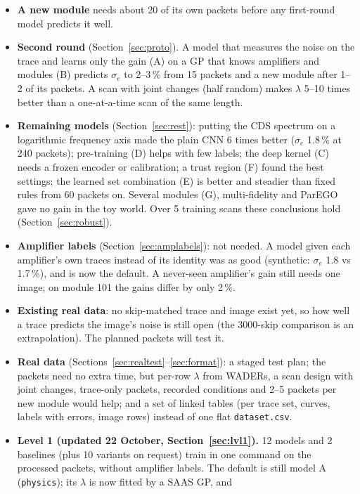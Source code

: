 \documentclass[10pt]{article}
\newcommand{\code}[1]{\texttt{#1}}
\begin{document}
\begin{basic}
\begin{itemize}
  traces it is 3.6\,\%.
\item \textbf{A new module} needs about 20 of its own packets before any first-round model predicts it well.
\item \textbf{Second round} (Section~\ref{sec:proto}). A model that measures the noise on the trace and learns only the gain (A) on a GP
  that knows amplifiers and modules (B) predicts $\sigma_e$ to 2--3\,\% from 15 packets and a new module after 1--2 of its packets. A scan
  with joint changes (half random) makes $\lambda$ 5--10 times better than a one-at-a-time scan of the same length.
\item \textbf{Remaining models} (Section~\ref{sec:rest}): putting the CDS spectrum on a logarithmic frequency axis made the plain CNN
  6 times better ($\sigma_e$ 1.8\,\% at 240 packets); pre-training (D) helps with few labels; the deep kernel (C) needs a frozen encoder or
  calibration; a trust region (F) found the best settings; the learned set combination (E) is better and steadier than fixed rules
  from 60 packets on. Several modules (G), multi-fidelity and ParEGO gave no gain in the toy world. Over 5 training scans these
  conclusions hold (Section~\ref{sec:robust}).
\item \textbf{Amplifier labels} (Section~\ref{sec:amplabels}): not needed. A model given each amplifier's own traces instead of its identity
  was as good (synthetic: $\sigma_e$ 1.8 vs 1.7\,\%), and is now the default. A never-seen amplifier's gain still needs one image; on
  module 101 the gains differ by only 2\,\%.
\item \textbf{Existing real data}: no skip-matched trace and image exist yet, so how well a trace predicts the image's noise is still
  open (the 3000-skip comparison is an extrapolation). The planned packets will test it.
\item \textbf{Real data} (Sections~\ref{sec:realtest}--\ref{sec:format}): a staged test plan; the packets need no extra time, but per-row
  $\lambda$ from WADERs, a scan design with joint changes, trace-only packets, recorded conditions and 2--5 packets per new module would help;
  and a set of linked tables (per trace set, curves, labels with errors, image rows) instead of one flat \code{dataset.csv}.
\item \textbf{Level 1 (updated 22 October, Section~\ref{sec:lvl1}).} 12 models and 2 baselines (plus 10 variants on request) train in one
  command on the processed packets, without amplifier labels. The default is still model A (\code{physics}); its $\lambda$ is now fitted by a SAAS GP, and

\end{itemize}
\end{basic}
\end{document}
